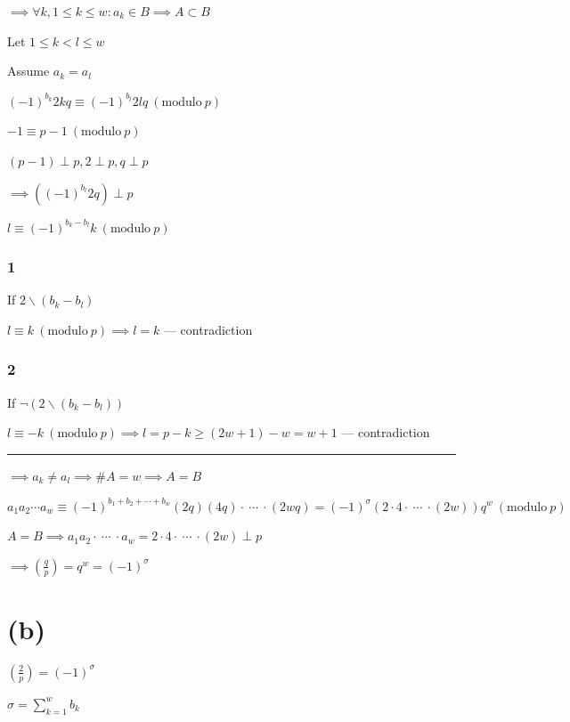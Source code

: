 \documentclass{article}
\begin{document}
\( \implies \forall k, 1 \leq k \leq w: a_{k} \in B \implies A \subset B \)

Let \( 1 \leq k < l \leq w \)

Assume \( a_{k} = a_{l} \)

\( {(-1)}^{b_{k}} 2kq \equiv {(-1)}^{b_{l}} 2lq \ (\mathrm{modulo}\ p) \)

\( -1 \equiv p - 1  \ (\mathrm{modulo}\ p) \)

\( (p - 1) \perp p, 2 \perp p, q \perp p \)

\( \implies ({(-1)}^{b_{l}} 2q) \perp p \)

\( l \equiv {(-1)}^{b_{k}-b_{l}}k \ (\mathrm{modulo}\ p) \)

\subsubsection*{1}

If \( 2 \backslash (b_{k} - b_{l}) \)

\( l \equiv k \ (\mathrm{modulo}\ p) \implies l = k \) --- contradiction

\subsubsection*{2}

If \( \lnot(2 \backslash (b_{k} - b_{l})) \)

\( l \equiv -k \ (\mathrm{modulo}\ p) \implies l = p - k \geq (2w+1)-w = w + 1 \) --- contradiction

\bigskip\hrule\bigskip

\( \implies a_{k} \neq a_{l} \implies \#A = w \implies A = B \)

\( a_{1}a_{2}\cdots a_{w} \equiv {(-1)}^{b_{1}+b_{2}+\cdots + b_{w}} (2q)(4q) \cdot\ \cdots\ \cdot (2wq) = {(-1)}^{\sigma} (2 \cdot 4 \cdot\ \cdots\ \cdot (2w))q^{w} \ (\mathrm{modulo}\ p) \)

\( A = B \implies a_{1}a_{2} \cdot\ \cdots\ \cdot a_{w} = 2 \cdot 4 \cdot\ \cdots\ \cdot (2w) \perp p \)

\( \implies (\frac{q}{p}) = q^{w} = {(-1)}^\sigma \)

\section*{(b)}

\( (\frac{2}{p}) = {(-1)}^\sigma \)

\( \sigma = \sum_{k=1}^{w} b_{k} \)
\end{document}

